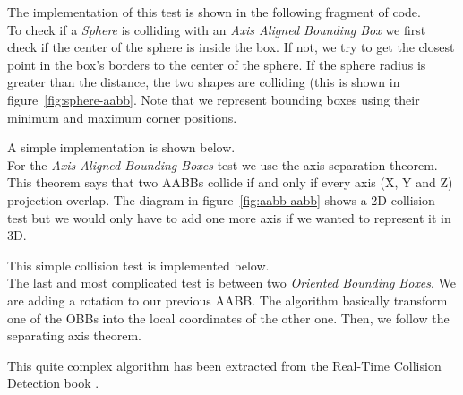 
The implementation of this test is shown in the following fragment of code.\\



To check if a \textit{Sphere} is colliding with an \textit{Axis Aligned Bounding Box} we first check
if the center of the sphere is inside the box. If not, we try to get the closest point in the box's
borders to the center of the sphere. If the sphere radius is greater than the distance, the two shapes
are colliding (this is shown in figure~\ref{fig:sphere-aabb}. Note that we represent bounding boxes
using their minimum and maximum corner positions.\\


A simple implementation is shown below.\\



For the \textit{Axis Aligned Bounding Boxes} test we use the axis separation theorem.
This theorem says that two AABBs collide if and only if every axis (X, Y and Z)
projection overlap. The diagram in figure~\ref{fig:aabb-aabb} shows a 2D collision test
but we would only have to add one more axis if we wanted to represent it in 3D.\\


This simple collision test is implemented below.\\



The last and most complicated test is between two \textit{Oriented Bounding Boxes}. We are adding
a rotation to our previous AABB. The algorithm basically transform one of the OBBs into the
local coordinates of the other one. Then, we follow the separating axis theorem.\\


This quite complex algorithm has been extracted from the Real-Time Collision Detection
book \cite{eric05}.\\

